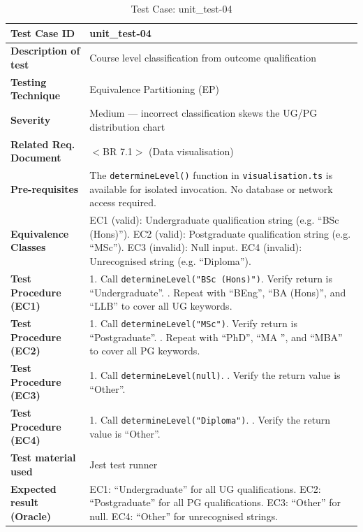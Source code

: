 \begin{table}[h!]
\centering
\caption{Test Case: unit\_test-04}
\begin{tabular}{|p{}|p{}|}
\hline
\textbf{Test Case ID} & unit\_test-04 \\ \hline
\textbf{Description of test} & Course level classification from outcome qualification \\ \hline
\textbf{Testing Technique} & Equivalence Partitioning (EP) \\ \hline
\textbf{Severity} & Medium --- incorrect classification skews the UG/PG distribution chart \\ \hline
\textbf{Related Req. Document} & $<$BR 7.1$>$ (Data visualisation) \\ \hline
\textbf{Pre-requisites} & The \texttt{determineLevel()} function in \texttt{visualisation.ts} is available for isolated invocation. No database or network access required. \\ \hline
\textbf{Equivalence Classes} & EC1 (valid): Undergraduate qualification string (e.g. ``BSc (Hons)''). \newline EC2 (valid): Postgraduate qualification string (e.g. ``MSc''). \newline EC3 (invalid): Null input. \newline EC4 (invalid): Unrecognised string (e.g. ``Diploma''). \\ \hline
\textbf{Test Procedure (EC1)} & 1. Call \texttt{determineLevel("BSc (Hons)")}. Verify return is ``Undergraduate''. \newline 2. Repeat with ``BEng'', ``BA (Hons)'', and ``LLB'' to cover all UG keywords. \\ \hline
\textbf{Test Procedure (EC2)} & 1. Call \texttt{determineLevel("MSc")}. Verify return is ``Postgraduate''. \newline 2. Repeat with ``PhD'', ``MA '', and ``MBA'' to cover all PG keywords. \\ \hline
\textbf{Test Procedure (EC3)} & 1. Call \texttt{determineLevel(null)}. \newline 2. Verify the return value is ``Other''. \\ \hline
\textbf{Test Procedure (EC4)} & 1. Call \texttt{determineLevel("Diploma")}. \newline 2. Verify the return value is ``Other''. \\ \hline
\textbf{Test material used} & Jest test runner \\ \hline
\textbf{Expected result (Oracle)} & EC1: ``Undergraduate'' for all UG qualifications. \newline EC2: ``Postgraduate'' for all PG qualifications. \newline EC3: ``Other'' for null. \newline EC4: ``Other'' for unrecognised strings. \\ \hline

\end{tabular}
\end{table}
